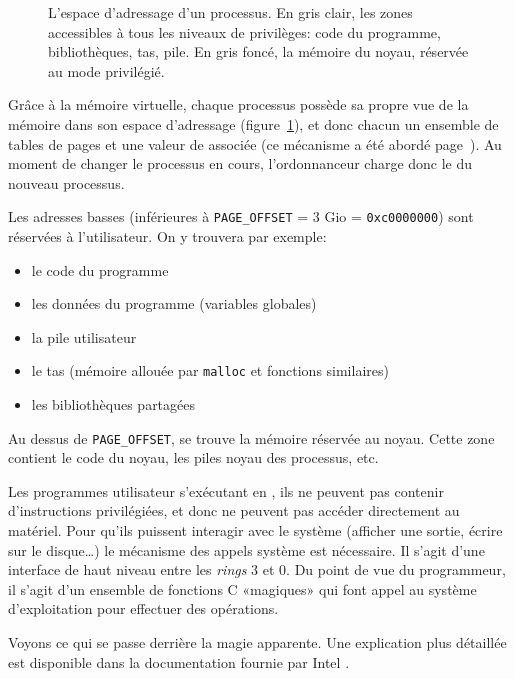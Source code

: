 \begin{figure} %
\centering


\caption[Espace d'adressage d'un processus]{L'espace d'adressage d'un processus.
En gris clair, les zones accessibles à tous les niveaux de privilèges: code du
programme, bibliothèques, tas, pile. En gris foncé, la mémoire du noyau,
réservée au mode privilégié.}

\label{fig:memmap}
\end{figure}

Grâce à la mémoire virtuelle, chaque processus possède sa propre vue de la
mémoire dans son espace d'adressage (figure~\ref{fig:memmap}), et donc chacun un
ensemble de tables de pages et une valeur de \crtrois{} associée (ce mécanisme a
été abordé page~\pageref{page:mem-virt}). Au moment de changer le processus en
cours, l'ordonnanceur charge donc le \crtrois{} du nouveau processus.

Les adresses basses (inférieures à \texttt{PAGE\_OFFSET} = 3 Gio =
\texttt{0xc0000000}) sont réservées à l'utilisateur. On y trouvera par exemple:

\begin{itemize}
\item le code du programme
\item les données du programme (variables globales)
\item la pile utilisateur
\item le tas (mémoire allouée par \texttt{malloc} et fonctions similaires)
\item les bibliothèques partagées
\end{itemize}

Au dessus de \texttt{PAGE\_OFFSET}, se trouve la mémoire réservée au noyau.
Cette zone contient le code du noyau, les piles noyau des processus, etc.

\label{sec:impl-syscall}

Les programmes utilisateur s'exécutant en , ils ne peuvent pas contenir
d'instructions privilégiées, et donc ne peuvent pas accéder directement au
matériel. Pour qu'ils puissent interagir avec le système (afficher une sortie,
écrire sur le disque…) le mécanisme des appels système est nécessaire. Il s'agit
d'une interface de haut niveau entre les \emph{rings} 3 et 0. Du point de vue du
programmeur, il s'agit d'un ensemble de fonctions C «magiques» qui font appel
au système d'exploitation pour effectuer des opérations.

Voyons ce qui se passe derrière la magie apparente. Une explication plus
détaillée est disponible dans la documentation fournie par Intel
\cite{intelsys}.


